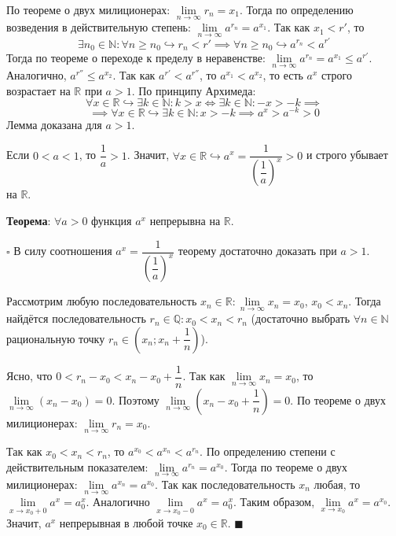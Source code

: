 \documentclass[12pt, a4paper, reqno]{article}
\begin{document}
    По теореме о двух милиционерах: $\lim\limits_{n\to\infty} r_n = x_1$. Тогда по определению
    возведения в действительную степень: $\lim\limits_{n\to\infty} a^{r_n} = a^{x_1}$. Так как
    $x_1 < r'$, то
    \begin{equation*}
        \exists n_0\in\mathbb{N}: \forall n\geq n_0\hookrightarrow r_n < r' \implies
        \forall n\geq n_0\hookrightarrow a^{r_n} < a^{r'}
    \end{equation*}
    Тогда по теореме о переходе к пределу в
    неравенстве: $\lim\limits_{n\to\infty} a^{r_n} = a^{x_1} \leq a^{r'}$. Аналогично, $a^{r''}
    \leq a^{x_2}$. Так как $a^{r'} < a^{r''}$, то $a^{x_1} < a^{x_2}$, то есть $a^x$ строго
    возрастает на $\mathbb{R}$ при $a > 1$. По принципу Архимеда:
    \begin{equation*}
        \forall x\in\mathbb{R}\hookrightarrow\exists k\in\mathbb{N}: k > x \iff
        \exists k\in\mathbb{N}: -x > -k \implies
    \end{equation*}
    \begin{equation*}
        \implies \forall x\in\mathbb{R}\hookrightarrow\exists k\in
        \mathbb{N}: x > -k \implies a^x > a^{-k} > 0
    \end{equation*}
    Лемма доказана для $a > 1$.

    Если $0 < a < 1$, то $\dfrac{1}{a} > 1$. Значит, $\forall x\in\mathbb{R}\hookrightarrow a^x =
    \dfrac{1}{\left(\dfrac{1}{a}\right)^x} > 0$ и строго убывает на $\mathbb{R}$.

    \textbf{Теорема}: $\forall a > 0$ функция $a^x$ непрерывна на $\mathbb{R}$.

    $\square$ В силу соотношения $a^x = \dfrac{1}{\left(\dfrac{1}{a}\right)^x}$ теорему достаточно
    доказать при $a > 1$.

    Рассмотрим любую последовательность $x_n\in\mathbb{R}: \lim\limits_{n\to\infty} x_n = x_0$,
    $x_0 < x_n$. Тогда найдётся последовательность $r_n\in\mathbb{Q}: x_0 < x_n < r_n$ (достаточно
    выбрать $\forall n\in\mathbb{N}$ рациональную точку $r_n\in\left(x_n; x_n + \dfrac{1}{n}\right)$).

    Ясно, что $0 < r_n - x_0 < x_n - x_0 + \dfrac{1}{n}$. Так как $\lim\limits_{n\to\infty} x_n =
    x_0$, то $\lim\limits_{n\to\infty} (x_n - x_0) = 0$. Поэтому $\lim\limits_{n\to\infty} \left(x_n
    - x_0 + \dfrac{1}{n}\right) = 0$. По теореме о двух милиционерах: $\lim\limits_{n\to\infty} r_n
    = x_0$.

    Так как $x_0 < x_n < r_n$, то $a^{x_0} < a^{x_n} < a^{r_n}$. По определению степени с
    действительным показателем: $\lim\limits_{n\to\infty} a^{r_n} = a^{x_0}$. Тогда по теореме о
    двух милиционерах: $\lim\limits_{n\to\infty} a^{x_n} = a^{x_0}$. Так как последовательность
    $x_n$ любая, то $\lim\limits_{x\to x_0 + 0}a^x = a^x_0$. Аналогично
    $\lim\limits_{x\to x_0 - 0}a^x = a^x_0$. Таким образом, $\lim\limits_{x\to x_0}a^x = a^{x_0}$.
    Значит, $a^x$ непрерывная в любой точке $x_0\in\mathbb{R}$. $\blacksquare$
\end{document}
